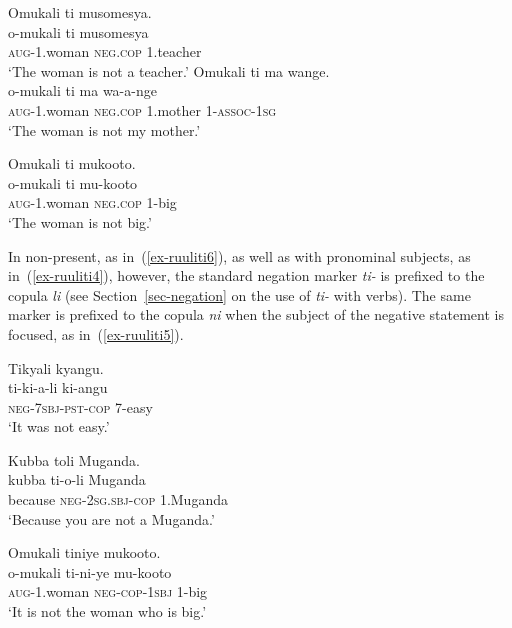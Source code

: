 \ea \label{ex-ruulinonverbalneg}
\begin{xlist}
\ex \label{ex-ruuliti1}
	\glll Omukali ti musomesya.\\
		  o-mukali ti musomesya\\
		\textsc{aug}-1.woman \textsc{neg}.\textsc{cop} 1.teacher\\
	\glt ‘The woman is not a teacher.’ 
\ex \label{ex-ruuliti2}
	\glll Omukali ti ma wange.\\
		  o-mukali ti ma wa-a-nge\\
		\textsc{aug}-1.woman \textsc{neg}.\textsc{cop} 1.mother 1-\textsc{assoc}-\textsc{1sg}\\
	\glt ‘The woman is not my mother.’ 	

\ex \label{ex-ruuliti3}
	\glll Omukali ti mukooto.\\
		  o-mukali ti mu-kooto\\
		\textsc{aug}-1.woman \textsc{neg}.\textsc{cop} 1-big\\
	\glt ‘The woman is not big.’
\end{xlist}
\z

\noindent In non-present, as in~(\ref{ex-ruuliti6}), as well as with pronominal subjects, as in~(\ref{ex-ruuliti4}), however, the standard negation marker \textit{ti-} is prefixed to the copula \textit{li} (see Section~\ref{sec-negation} on the use of \textit{ti-} with verbs). 
The same marker is prefixed to the copula \textit{ni} when the subject of the negative statement is focused, as in~(\ref{ex-ruuliti5}).

\ea \label{ex-ruulinonverbalneg2}
\begin{xlist}
\ex \label{ex-ruuliti6}
	\glll Tikyali kyangu.\\
		  ti-ki-a-li ki-angu\\
		\textsc{neg}-\textsc{7sbj}-\textsc{pst}-\textsc{cop} 7-easy\\
\glt ‘It was not easy.’

\ex \label{ex-ruuliti4}
	\glll Kubba toli Muganda.\\
	  kubba ti-o-li Muganda\\
		because \textsc{neg}-2\textsc{sg.sbj}-\textsc{cop} 1.Muganda\\
\glt ‘Because you are not a Muganda.’ 

\ex \label{ex-ruuliti5}
	\glll Omukali tiniye mukooto.\\
		  o-mukali ti-ni-ye mu-kooto\\
		\textsc{aug}-1.woman \textsc{neg}-\textsc{cop}-\textsc{1sbj} 1-big\\
	\glt ‘It is not the woman who is big.’ 	
\end{xlist}
\z


